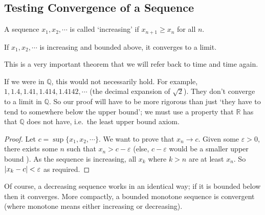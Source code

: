 \subsection{Testing Convergence of a Sequence}
A sequence \(x_1, x_2, \cdots\) is called `increasing' if \(x_{n+1} \geq x_n\) for all \(n\).
\begin{theorem}
	If \(x_1, x_2, \cdots\) is increasing and bounded above, it converges to a limit.
\end{theorem}
This is a very important theorem that we will refer back to time and time again.
\begin{note}
	If we were in \(\mathbb Q\), this would not necessarily hold.
	For example, \(1, 1.4, 1.41, 1.414, 1.4142, \cdots\) (the decimal expansion of \(\sqrt{2}\)).
	They don't converge to a limit in \(\mathbb Q\).
	So our proof will have to be more rigorous than just `they have to tend to somewhere below the upper bound'; we must use a property that \(\mathbb R\) has that \(\mathbb Q\) does not have, i.e.\ the least upper bound axiom.
\end{note}
\begin{proof}
	Let \(c = \sup \{ x_1, x_2, \cdots \}\).
	We want to prove that \(x_n \to c\).
	Given some \(\varepsilon > 0\), there exists some \(n\) such that \(x_n > c - \varepsilon\) (else, \(c - \varepsilon\) would be a smaller upper bound \contradiction).
	As the sequence is increasing, all \(x_k\) where \(k > n\) are at least \(x_n\).
	So \(\abs{x_k - c} < \varepsilon\) as required.
\end{proof}
Of course, a decreasing sequence works in an identical way; if it is bounded below then it converges.
More compactly, a bounded monotone sequence is convergent (where monotone means either increasing or decreasing).

